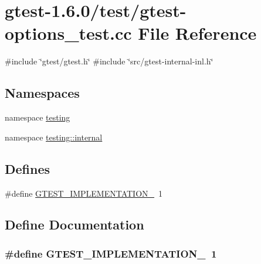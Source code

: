 \hypertarget{gtest-options__test_8cc}{\section{gtest-\/1.6.0/test/gtest-\/options\-\_\-test.cc \-File \-Reference}
\label{dd/d90/gtest-options__test_8cc}
}
{\ttfamily \#include \char`\"{}gtest/gtest.\-h\char`\"{}}\*
{\ttfamily \#include \char`\"{}src/gtest-\/internal-\/inl.\-h\char`\"{}}\*
\subsection*{\-Namespaces}
\begin{DoxyCompactItemize}
\item 
namespace \hyperlink{namespacetesting}{testing}
\item 
namespace \hyperlink{namespacetesting_1_1internal}{testing\-::internal}
\end{DoxyCompactItemize}
\subsection*{\-Defines}
\begin{DoxyCompactItemize}
\item 
\#define \hyperlink{gtest-options__test_8cc_a83bd232fd1077579fada92c31bb7469f}{\-G\-T\-E\-S\-T\-\_\-\-I\-M\-P\-L\-E\-M\-E\-N\-T\-A\-T\-I\-O\-N\-\_\-}~1
\end{DoxyCompactItemize}


\subsection{\-Define \-Documentation}
\hypertarget{gtest-options__test_8cc_a83bd232fd1077579fada92c31bb7469f}{
\subsubsection[{\-G\-T\-E\-S\-T\-\_\-\-I\-M\-P\-L\-E\-M\-E\-N\-T\-A\-T\-I\-O\-N\-\_\-}]{\setlength{\rightskip}{0pt plus 5cm}\#define {\bf \-G\-T\-E\-S\-T\-\_\-\-I\-M\-P\-L\-E\-M\-E\-N\-T\-A\-T\-I\-O\-N\-\_\-}~1}}\label{dd/d90/gtest-options__test_8cc_a83bd232fd1077579fada92c31bb7469f}


